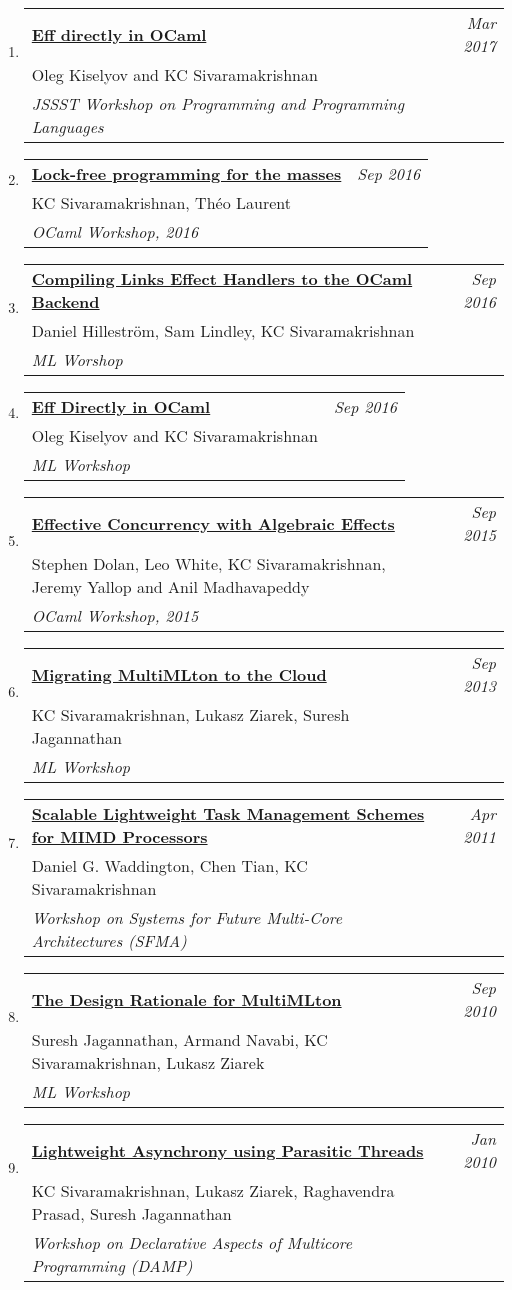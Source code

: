 \documentclass[10pt]{article}
\makeatletter
\newcommand{\lbar}[1]{{\color{#1}\ding{118}}\hspace*{2pt}}
\newenvironment{benumerate}[2]{
    \let\oldItem\item
    \def\item{\addtocounter{enumi}{-2}\oldItem}
    \begin{enumerate}[#2] \itemsep3pt
    \setcounter{enumi}{#1}
    \addtocounter{enumi}{1}}
  {\end{enumerate}}
\newenvironment{publication}[5]
{ \item
  \begin{tabular*}{7.5in}{p{6.3in}@{\extracolsep{\fill}}r}
    \href{#1}{\textbf{#2}} & \textit{#3}\\ #4 &\\ \textit{#5}&\\
  \end{tabular*}
} {}
\newenvironment{region}[3]{%
  \vspace*{0.5ex}
  {\scalebox{1.4}{\textbf{#1}}}
  \begin{benumerate}{#3}{\color{RoyalBlue}#2}}
  {\end{benumerate}\vspace{0.8ex}}
\makeatother
\begin{document}
\begin{region} {\lbar{purple}Workshop Publications}{{W}1}{23}
  \begin{publication}{http://kcsrk.info/papers/eff_ocaml_ppl17.pdf}
    {Eff directly in OCaml}
    {Mar 2017}{Oleg Kiselyov and KC Sivaramakrishnan}
    {JSSST Workshop on Programming and Programming Languages}
  \end{publication}

  \begin{publication}{http://kcsrk.info/papers/reagents_ocaml16.pdf}
    {Lock-free programming for the masses}
    {Sep 2016}{KC Sivaramakrishnan, Théo Laurent}
    {OCaml Workshop, 2016}
  \end{publication}

  \begin{publication}{http://kcsrk.info/papers/links_ocaml_ml16.pdf}
    {Compiling Links Effect Handlers to the OCaml Backend}
    {Sep 2016}{Daniel Hilleström, Sam Lindley, KC Sivaramakrishnan}
    {ML Worshop}
  \end{publication}

  \begin{publication}{http://kcsrk.info/papers/eff_ocaml_ml16.pdf}
    {Eff Directly in OCaml}
    {Sep 2016}{Oleg Kiselyov and KC Sivaramakrishnan}
    {ML Workshop}
  \end{publication}

  \begin{publication}{http://kcsrk.info/papers/effects_ocaml15.pdf}
    {Effective Concurrency with Algebraic Effects}
    {Sep 2015}{Stephen Dolan, Leo White, KC Sivaramakrishnan, Jeremy Yallop and Anil Madhavapeddy}
    {OCaml Workshop, 2015}
  \end{publication}

  \begin{publication}{http://kcsrk.info/papers/mmcloud_mlw13.pdf}
    {Migrating MultiMLton to the Cloud}
    {Sep 2013}{KC Sivaramakrishnan, Lukasz Ziarek, Suresh Jagannathan}
    {ML Workshop}
  \end{publication}

  \begin{publication}{http://kcsrk.info/papers/snapple_sfma11.pdf}
    {Scalable Lightweight Task Management Schemes for MIMD Processors}
    {Apr 2011}{Daniel G. Waddington, Chen Tian, KC Sivaramakrishnan}
    {Workshop on Systems for Future Multi-Core Architectures (SFMA)}
  \end{publication}

  \begin{publication}{http://kcsrk.info/papers/multimlton_mlw10.pdf}
    {The Design Rationale for MultiMLton}
    {Sep 2010}{Suresh Jagannathan, Armand Navabi, KC Sivaramakrishnan, Lukasz Ziarek}
    {ML Workshop}
  \end{publication}

  \begin{publication}{http://kcsrk.info/papers/parasites_damp10.pdf}
    {Lightweight Asynchrony using Parasitic Threads}
    {Jan 2010}{KC Sivaramakrishnan, Lukasz Ziarek, Raghavendra Prasad, Suresh Jagannathan}
    {Workshop on Declarative Aspects of Multicore Programming (DAMP)}
  \end{publication}
\end{region}
\end{document}
